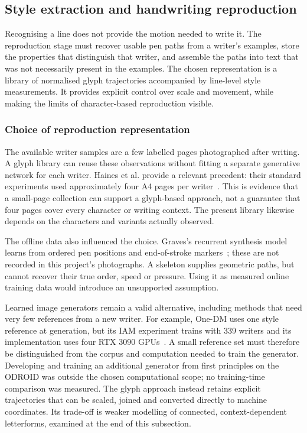 \subsection{Style extraction and handwriting reproduction}
\label{sec:des-reproduction}
Recognising a line does not provide the motion needed to write it. The reproduction stage must recover usable pen paths from a writer's examples, store the properties that distinguish that writer, and assemble the paths into text that was not necessarily present in the examples. The chosen representation is a library of normalised glyph trajectories accompanied by line-level style measurements. It provides explicit control over scale and movement, while making the limits of character-based reproduction visible.~\cite[style.py; synthesise.py; reproduce.py]{braunepipeline2026}


\subsubsection{Choice of reproduction representation}
The available writer samples are a few labelled pages photographed after writing. A glyph library can reuse these observations without fitting a separate generative network for each writer. Haines et al. provide a relevant precedent: their standard experiments used approximately four A4 pages per writer~\cite[PDF p.~4, Sec.~4]{haines2016}. This is evidence that a small-page collection can support a glyph-based approach, not a guarantee that four pages cover every character or writing context. The present library likewise depends on the characters and variants actually observed.

The offline data also influenced the choice. Graves's recurrent synthesis model learns from ordered pen positions and end-of-stroke markers~\cite[p.~18]{graves2013}; these are not recorded in this project's photographs. A skeleton supplies geometric paths, but cannot recover their true order, speed or pressure. Using it as measured online training data would introduce an unsupported assumption.~\cite[project records; implementation]{brauneevidence2026,braunepipeline2026}

Learned image generators remain a valid alternative, including methods that need very few references from a new writer. For example, One-DM uses one style reference at generation, but its IAM experiment trains with 339 writers and its implementation uses four RTX 3090 GPUs~\cite[p.~9]{dai2024}. A small reference set must therefore be distinguished from the corpus and computation needed to train the generator. Developing and training an additional generator from first principles on the ODROID was outside the chosen computational scope; no training-time comparison was measured. The glyph approach instead retains explicit trajectories that can be scaled, joined and converted directly to machine coordinates. Its trade-off is weaker modelling of connected, context-dependent letterforms, examined at the end of this subsection.~\cite[style.py; synthesise.py; reproduce.py]{braunepipeline2026}

